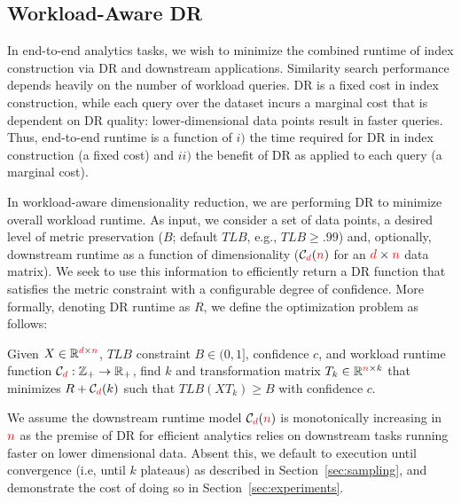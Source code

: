 \subsection{Workload-Aware DR}
\label{subsec:wadr}

In end-to-end analytics tasks, we wish to minimize the combined runtime of index construction via DR and downstream applications. 
Similarity search performance depends heavily on the number of workload queries.
DR is a fixed cost in index construction, while each query over the dataset incurs a marginal cost that is dependent on DR quality: lower-dimensional data points result in faster queries. 
Thus, end-to-end runtime is a function of $i)$ the time required for DR in index construction (a fixed cost) and $ii)$ the benefit of DR as applied to each query (a marginal cost).

In workload-aware dimensionality reduction, we are performing DR to minimize overall workload runtime. As input, we consider a set of data points, a desired level of metric preservation ($B$; default $TLB$, e.g., $TLB \geq .99$) and, optionally, downstream runtime as a function of dimensionality ($\mathcal{C}_{\color{red}d}({\color{red}n})$ for an ${\color{red}d}\times {\color{red}n}$ data matrix).  
We seek to use this information to efficiently return a DR function that satisfies the metric constraint with a configurable degree of confidence.
More formally, denoting DR runtime as $R$, we define the optimization problem as follows:
\begin{problem}
\label{def:opt}
  Given $X \in \mathbb{R}^{{\color{red}d} \times {\color{red}n}}$, $TLB$ constraint $B \in 
  (0, 1]$, confidence $c$, and workload runtime function $\mathcal{C}_{\color{red}d}:\mathbb{Z}_{+} \rightarrow \mathbb{R}_{+}$, find $k$ and transformation
  matrix $T_k \in \mathbb{R}^{{\color{red}n} \times k}$ that minimizes $R + \mathcal{C}_{\color{red}d}(k)$
  such that $TLB(XT_k) \geq B$ with confidence $c$.
\end{problem}

We assume the downstream runtime model $\mathcal{C}_{\color{red}d}({\color{red}n})$ is monotonically increasing in ${\color{red}n}$ as the premise of DR for efficient analytics relies on downstream tasks running faster on lower dimensional data.
Absent this, we default to execution until convergence (i.e, until $k$ plateaus) as described in Section~\ref{sec:sampling}, and demonstrate the cost of doing so in Section~\ref{sec:experiments}.

